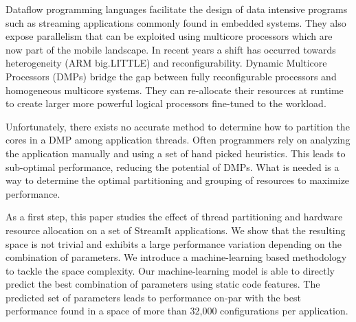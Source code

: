 Dataflow programming languages facilitate the design of data intensive programs such as streaming applications commonly found in embedded systems.
They also expose parallelism that can be exploited using multicore processors which are now part of the mobile landscape.
In recent years a shift has occurred towards heterogeneity (\eg ARM big.LITTLE) and reconfigurability.
Dynamic Multicore Processors (DMPs) bridge the gap between fully reconfigurable processors and homogeneous multicore systems.
They can re-allocate their resources at runtime to create larger more powerful logical processors fine-tuned to the workload.

Unfortunately, there exists no accurate method to determine how to partition the cores in a DMP among application threads.
Often programmers rely on analyzing the application manually and using a set of hand picked heuristics.
This leads to sub-optimal performance, reducing the potential of DMPs.
What is needed is a way to determine the optimal partitioning and grouping of resources to maximize performance.

As a first step, this paper studies the effect of thread partitioning and hardware resource allocation on a set of StreamIt applications.
We show that the resulting space is not trivial and exhibits a large performance variation depending on the combination of parameters.
We introduce a machine-learning based methodology to tackle the space complexity.
Our machine-learning model is able to directly predict the best combination of parameters using static code features.
The predicted set of parameters leads to performance on-par with the best performance found in a space of more than 32,000 configurations per application.
